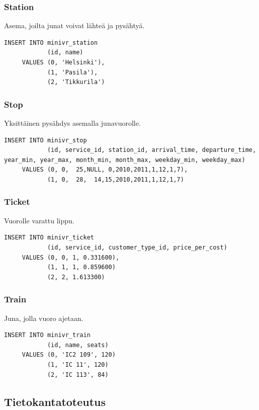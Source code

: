 \documentclass[a4paper,twoside,titlepage,12pt]{article}
\begin{document}
\subsubsection{Station}

Asema, joilta junat voivat lähteä ja pysähtyä.
\begin{lstlisting}
INSERT INTO minivr_station
            (id, name)
     VALUES (0, 'Helsinki'),
            (1, 'Pasila'),
            (2, 'Tikkurila')
\end{lstlisting}

\subsubsection{Stop}

Yksittäinen pysähdys asemalla junavuorolle.
\begin{lstlisting}
INSERT INTO minivr_stop
            (id, service_id, station_id, arrival_time, departure_time, year_min, year_max, month_min, month_max, weekday_min, weekday_max)
     VALUES (0, 0,  25,NULL, 0,2010,2011,1,12,1,7),
            (1, 0,  28,  14,15,2010,2011,1,12,1,7)
\end{lstlisting}

\subsubsection{Ticket}

Vuorolle varattu lippu.
\begin{lstlisting}
INSERT INTO minivr_ticket
            (id, service_id, customer_type_id, price_per_cost)
     VALUES (0, 0, 1, 0.331600),
            (1, 1, 1, 0.859600)
            (2, 2, 1.613300)
\end{lstlisting}

\subsubsection{Train}

Juna, jolla vuoro ajetaan.
\begin{lstlisting}
INSERT INTO minivr_train
            (id, name, seats)
     VALUES (0, 'IC2 109', 120)
            (1, 'IC 11', 120)
            (2, 'IC 113', 84)
\end{lstlisting}


\subsection{Tietokantatoteutus}
\end{document}

